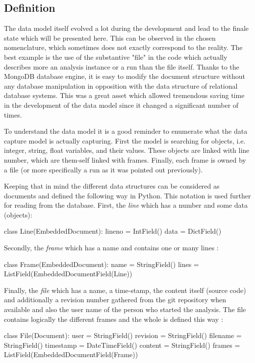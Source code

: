 \subsection{Definition}
The data model itself evolved a lot during the development and lead to the finale state which will be presented here. This can be observed in the chosen nomenclature, which sometimes does not exactly correspond to the reality. The best example is the use of the substantive "file" in the code which actually describes more an analysis instance or a run than the file itself. Thanks to the MongoDB database engine, it is easy to modify the document structure without any database manipulation in opposition with the data structure of relational database systems. This was a great asset which allowed tremendous saving time in the development of the data model since it changed a significant number of times.

To understand the data model it is a good reminder to enumerate what the data capture model is actually capturing. First the model is searching for objects, i.e. integer, string, float variables, and their values. These objects are linked with line number, which are them-self linked with frames. Finally, each frame is owned by a file (or more specifically a run as it was pointed out previously).

Keeping that in mind the different data structures can be considered as documents and defined the following way in Python. This notation is used further for reading from the database. First, the \textit{line} which has a number and some data (objects):
\begin{python}
class Line(EmbeddedDocument):
    lineno = IntField()
    data = DictField()
\end{python}

Secondly, the \textit{frame} which has a name and contains one or many lines :

\begin{python}
class Frame(EmbeddedDocument):
    name = StringField()
    lines = ListField(EmbeddedDocumentField(Line))
\end{python}

Finally, the \textit{file} which has a name, a time-stamp, the content itself (source code) and additionally a revision number gathered from the git repository when available and also the user name of the person who started the analysis. The file contains logically the different frames and the whole is defined this way :
\begin{python}
class File(Document):
    user = StringField()
    revision = StringField()
    filename = StringField()
    timestamp = DateTimeField()
    content = StringField()
    frames = ListField(EmbeddedDocumentField(Frame))
\end{python}


